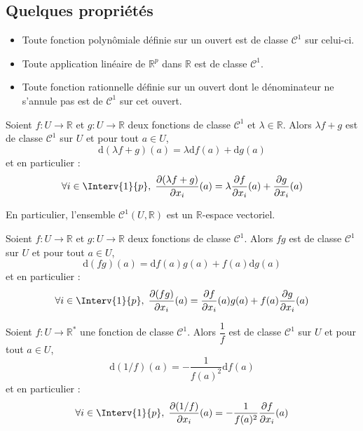 \documentclass[a4paper,10pt]{report}
\begin{document}
\subsection{Quelques propriétés}

\begin{prop} 
\begin{itemize}
\item Toute fonction polynômiale définie sur un ouvert est de classe $\mathcal{C}^1$ sur celui-ci.
\item Toute application linéaire de $\mathbb{R}^p$ dans $\mathbb{R}$ est de classe $\mathcal{C}^1$.
\item Toute fonction rationnelle définie sur un ouvert dont le dénominateur ne s'annule pas est de $\mathcal{C}^1$ sur cet ouvert.
\end{itemize}
\end{prop}

\begin{prop} Soient $f : U \rightarrow \mathbb{R}$ et $g :  U \rightarrow \mathbb{R}$ deux fonctions de classe $\mathcal{C}^1$ et $\lambda \in \mathbb{R}$. Alors $\lambda f+g$ est de classe $\mathcal{C}^1$ sur $U$ et pour tout $a \in U$,
$$ \textrm{d}(\lambda f + g)(a) = \lambda \textrm{d}f(a)+\textrm{d}g(a)$$
et en particulier :
$$ \forall i \in \Interv{1}{p}, \; \dfrac{\partial (\lambda f +g)}{\partial x_i}(a) = \lambda \dfrac{\partial f}{\partial x_i}(a) +  \dfrac{\partial g}{\partial x_i}(a)$$
\end{prop}

\begin{rem} En particulier, l'ensemble $\mathcal{C}^1(U, \mathbb{R})$ est un $\mathbb{R}$-espace vectoriel.
\end{rem}

\begin{prop} Soient $f : U \rightarrow \mathbb{R}$ et $g :  U \rightarrow \mathbb{R}$ deux fonctions de classe $\mathcal{C}^1$. Alors $fg$ est de classe $\mathcal{C}^1$ sur $U$ et pour tout $a \in U$,
$$ \textrm{d}(fg)(a) =\textrm{d}f(a)g(a) + f(a) \textrm{d}g(a)$$
et en particulier :
$$ \forall i \in \Interv{1}{p}, \; \dfrac{\partial (fg)}{\partial x_i}(a) = \dfrac{\partial f}{\partial x_i}(a) g(a) +f(a)  \dfrac{\partial g}{\partial x_i}(a)$$
\end{prop}

\begin{prop} Soient $f : U \rightarrow \mathbb{R}^*$ une fonction de classe $\mathcal{C}^1$. Alors $\dfrac{1}{f}$ est de classe $\mathcal{C}^1$ sur $U$ et pour tout $a \in U$,
$$\textrm{d}(1/f)(a) = - \dfrac{1}{f(a)^2} \textrm{d}f(a)$$
et en particulier :
$$ \forall i \in \Interv{1}{p}, \; \dfrac{\partial (1/f)}{\partial x_i}(a) = - \dfrac{1}{f(a)^2} \dfrac{\partial f }{\partial x_i}(a)$$
\end{prop}
\end{document}
